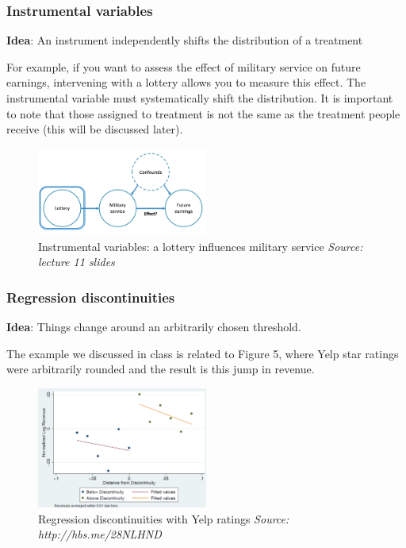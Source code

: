 \subsubsection{Instrumental variables}
\textbf{Idea}: An instrument independently shifts the distribution of a treatment

For example, if you want to assess the effect of military service on future earnings, intervening with a lottery allows you to measure this effect. The instrumental variable must systematically shift the distribution.  It is important to note that those assigned to treatment is not the same as the treatment people receive (this will be discussed later).

\begin{figure}[ht]
  \begin{center}
    \includegraphics[width=0.5\textwidth]{figures/fig7}
        \caption{Instrumental variables: a lottery influences military service \textit{ Source: lecture 11 slides}}
    \label{figure 7}
  \end{center}
\end{figure}

\subsubsection{Regression discontinuities}
\textbf{Idea}: Things change around an arbitrarily chosen threshold.  

The example we discussed in class is related to Figure 5, where Yelp star ratings were arbitrarily rounded and the result is this jump in revenue.

\begin{figure}[ht]
  \begin{center}
    \includegraphics[width=0.5\textwidth]{figures/fig5}
        \caption{Regression discontinuities with Yelp ratings \textit{ Source: http://hbs.me/28NLHND}}
    \label{figure 5}
  \end{center}
\end{figure}

